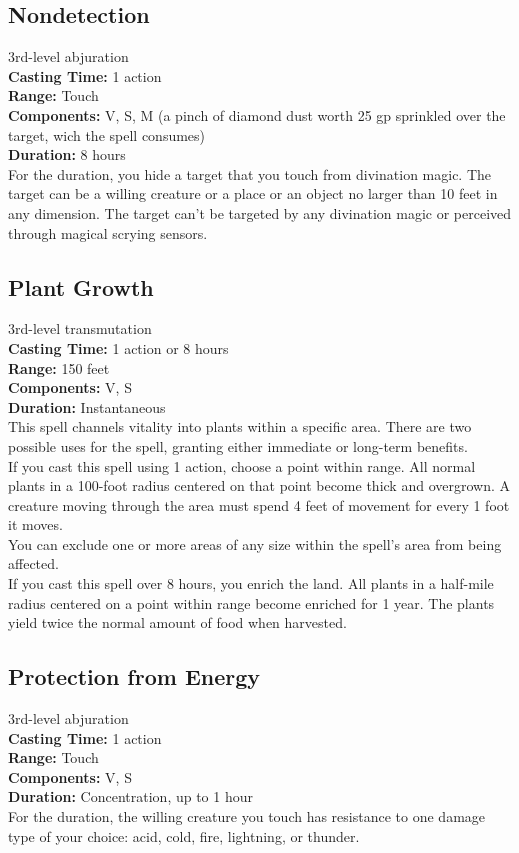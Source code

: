\documentclass[11pt, A4paper, english]{article}
\begin{document}
		\subsection{Nondetection}
3rd-level abjuration \\
\textbf{Casting Time:} 1 action \\
\textbf{Range:} Touch \\
\textbf{Components:} V, S, M (a pinch of diamond dust worth 25 gp sprinkled over the target, wich the spell consumes) \\
\textbf{Duration:} 8 hours \\
For the duration, you hide a target that you touch from divination magic. The target can be a willing creature or a place or an object no larger than 10 feet in any dimension. The target can’t be targeted by any divination magic or perceived through magical scrying sensors.

		\subsection{Plant Growth}
3rd-level transmutation \\
\textbf{Casting Time:} 1 action or 8 hours \\
\textbf{Range:} 150 feet \\
\textbf{Components:} V, S \\
\textbf{Duration:} Instantaneous \\
This spell channels vitality into plants within a specific area. There are two possible uses for the spell, granting either immediate or long-term benefits. \\
If you cast this spell using 1 action, choose a point within range. All normal plants in a 100-foot radius centered on that point become thick and overgrown. A creature moving through the area must spend 4 feet of movement for every 1 foot it moves. \\
You can exclude one or more areas of any size within the spell’s area from being affected. \\
If you cast this spell over 8 hours, you enrich the land. All plants in a half-mile radius centered on a point within range become enriched for 1 year. The plants yield twice the normal amount of food when harvested.

		\subsection{Protection from Energy}
3rd-level abjuration \\
\textbf{Casting Time:} 1 action \\
\textbf{Range:} Touch \\
\textbf{Components:} V, S \\
\textbf{Duration:} Concentration, up to 1 hour \\
For the duration, the willing creature you touch has resistance to one damage type of your choice: acid, cold, fire, lightning, or thunder.
\end{document}
